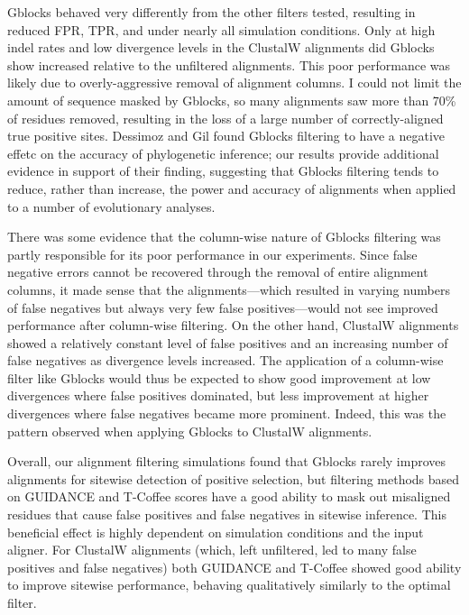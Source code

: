 Gblocks behaved very differently from the other filters tested,
resulting in reduced FPR, TPR, and \tpr under nearly all simulation
conditions. Only at high indel rates and low divergence levels in the
ClustalW alignments did Gblocks show increased \tpr relative to the
unfiltered alignments. This poor performance was likely due to
overly-aggressive removal of alignment columns. I could not limit the
amount of sequence masked by Gblocks, so many alignments saw more than
70\% of residues removed, resulting in the loss of a large number of
correctly-aligned true positive sites. Dessimoz and Gil
\citeyearpar{Dessimoz2010Phylogenetic} found Gblocks filtering to have
a negative effetc on the accuracy of phylogenetic inference; our
results provide additional evidence in support of their finding,
suggesting that Gblocks filtering tends to reduce, rather than
increase, the power and accuracy of alignments when applied to a
number of evolutionary analyses.

There was some evidence that the column-wise nature of Gblocks
filtering was partly responsible for its poor performance in our
experiments. Since false negative errors cannot be recovered through
the removal of entire alignment columns, it made sense that the
\prankc alignments---which resulted in varying numbers of false
negatives but always very few false positives---would not see improved
performance after column-wise filtering. On the other hand, ClustalW
alignments showed a relatively constant level of false positives and
an increasing number of false negatives as divergence levels
increased. The application of a column-wise filter like Gblocks would
thus be expected to show good improvement at low divergences where
false positives dominated, but less improvement at higher divergences
where false negatives became more prominent. Indeed, this was the
pattern observed when applying Gblocks to ClustalW alignments.

Overall, our alignment filtering simulations found that Gblocks rarely
improves alignments for sitewise detection of positive selection, but
filtering methods based on GUIDANCE and T-Coffee scores have a good
ability to mask out misaligned residues that cause false positives and
false negatives in sitewise inference. This beneficial effect is
highly dependent on simulation conditions and the input aligner. For
ClustalW alignments (which, left unfiltered, led to many false
positives and false negatives) both GUIDANCE and T-Coffee showed good
ability to improve sitewise performance, behaving qualitatively
similarly to the optimal filter.

